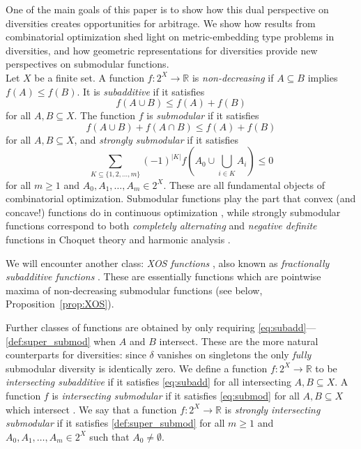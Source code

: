\documentclass{article}
\theoremstyle{plain}
\theoremstyle{definition}
\renewcommand{\Re}{\mathbb{R}}
\begin{document}
One of the main goals of this paper is to show how this dual perspective on diversities creates opportunities for arbitrage. We show how results from combinatorial optimization shed light on metric-embedding type problems in diversities, and how geometric representations for diversities provide new perspectives on submodular functions. \\


Let $X$ be a finite set. A function $f:2^X \rightarrow \Re$ is {\em non-decreasing} if $A \subseteq B$ implies $f(A) \leq f(B)$. It is {\em subadditive} if it satisfies
\begin{equation}
f(A \cup B) \leq f(A) + f(B) \label{eq:subadd}
\end{equation}
for all $A,B \subseteq X$. The function $f$ is {\em submodular} if it satisfies 
\begin{equation}
f(A \cup B) + f(A \cap B) \leq f(A) + f(B) \label{eq:submod}
\end{equation} 
for all $A,B \subseteq X$, and {\em strongly submodular} if it satisfies 
\begin{equation}
\sum_{K \subseteq \{1,2,\ldots,m\}} (-1)^{|K|} f\left(A_0 \cup \bigcup_{i \in K} A_i \right) \leq 0\label{def:super_submod}
\end{equation}
for all $m \geq 1$ and $A_0,A_1,\ldots,A_m \in 2^X$. These are all fundamental objects of combinatorial optimization. Submodular functions play the part that convex (and concave!) functions do in continuous optimization \cite{Lovasz1983}, while strongly submodular functions correspond to both  {\em completely alternating} and {\em negative definite} functions in Choquet theory \cite{choquet-1954-capacities,lovasz-2023-submodular-setfunctions} and harmonic analysis \cite{BergChristensenRessel1984}. 

We will encounter another class: {\em XOS functions} \cite{lehmann2006combinatorial}, also known as {\em fractionally subadditive functions} \cite{feige2009maximizing}. These are essentially functions which are pointwise maxima of non-decreasing submodular functions (see below, Proposition~\ref{prop:XOS}). 

Further classes of functions are obtained by only requiring \eqref{eq:subadd}---\eqref{def:super_submod} when $A$ and $B$ intersect. These are the more natural counterparts for diversities: since $\delta$ vanishes on singletons the only {\em fully} submodular diversity is identically zero. We define a function $f:2^X \rightarrow \Re$ to be {\em intersecting subadditive} if it satisfies \eqref{eq:subadd} for all intersecting $A,B \subseteq X$. 
A function $f$ is {\em intersecting submodular} if it satisfies \eqref{eq:submod} for all  $A,B \subseteq X$ which intersect \cite{Frank2011,Fujishige2005,Schrijver2003}. We say that a function $f:2^X \rightarrow \Re$  is {\em strongly intersecting submodular} if it satisfies \eqref{def:super_submod} for all $m \geq 1$ and $A_0,A_1,\ldots,A_m \in 2^X$ such that $A_0 \neq \emptyset$. 
\end{document}
